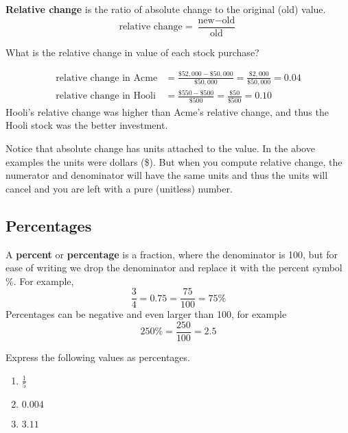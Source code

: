 \begin{definition}
  \textbf{Relative change} is the ratio of absolute change to the original (old) value.
  \[
    \text{relative change} = \frac{\text{new} - \text{old}}{\text{old}}
  \]
\end{definition}

\begin{example}
What is the relative change in value of each stock purchase?
\end{example}
\begin{solution}
  \begin{align*}
    \text{relative change in Acme}
    &= \frac{\$52,000 - \$50,000}{\$50,000} = \frac{\$2,000}{\$50,000} = 0.04 \\
    \text{relative change in Hooli}
    &= \frac{\$550 - \$500}{\$500} = \frac{\$50}{\$500} = 0.10
  \end{align*}
  Hooli's relative change was higher than Acme's relative change, and
  thus the Hooli stock was the better investment.
\end{solution}

\begin{note}
  Notice that absolute change has units attached to the value. In the
  above examples the units were dollars (\$). But when you compute
  relative change, the numerator and denominator will have the same
  units and thus the units will cancel and you are left with a pure
  (unitless) number.
\end{note}

\subsection{Percentages}
\label{sub:percentages}

\begin{definition}
  A \textbf{percent} or \textbf{percentage} is a fraction, where the
  denominator is 100, but for ease of writing we drop the denominator
  and replace it with the percent symbol \(\%\). For example,
  \[
    \frac{3}{4} = 0.75 = \frac{75}{100} = 75\%
  \]
  Percentages can be negative and even larger than 100, for example
  \[
    250\% = \frac{250}{100} = 2.5
  \]
\end{definition}

\begin{exercise}
  Express the following values as percentages.
  \begin{enumerate}
  \item \(\displaystyle\frac{1}{5}\)
  \item \(\displaystyle 0.004\)
  \item \(\displaystyle 3.11\)
  \end{enumerate}
\end{exercise}

